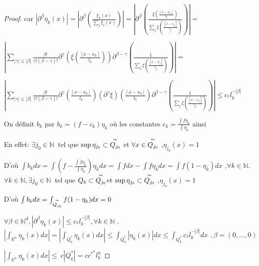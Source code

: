 \documentclass[12pt, a4paper, oneside]{article}
\begin{document}
\begin{proof}
	car $\left\vert \partial ^{\beta }\eta _{k}(x)\right\vert =\left\vert\partial ^{\beta }(\frac{\xi _{k}(x)}{\sum\limits_{j}\xi _{j}(x)})\right\vert =\left\vert \partial ^{\beta }(\frac{\xi (\frac{[x-x_{k}]}{
			l_{k}})}{\sum\limits_{j}\xi (\frac{[x-x_{j}]}{l_{j}})})\right\vert =$
	
	$\left\vert \sum\limits_{\left\vert \gamma \right\vert \leq \left\vert\beta \right\vert }\frac{\beta !}{\gamma !(\beta -\gamma )!}\partial^{\gamma }(\xi (\frac{[x-x_{k}]}{l_{k}}))\partial ^{\beta -\gamma }(\frac{1
	}{\sum\limits_{j}\xi (\frac{[x-x_{j}]}{l_{j}})})\right\vert =$
	
	$\left\vert\sum\limits_{\left\vert \gamma \right\vert\leq \left\vert \beta\right\vert }\frac{\beta !}{\gamma !(\beta -\gamma )!}\partial ^{\gamma }(\frac{[x-x_{k}]}{l_{k}})(\partial ^{\gamma }\xi )(\frac{[x-x_{k}]}{l_{k}})\partial ^{\beta -\gamma }(\frac{1}{\sum\limits_{j}\xi (\frac{[x-x_{j}]}{l_{j}})})\right\vert \leq c_{^{\beta }}l_{k}^{-\left\vert \beta\right\vert }$
	
	On définit $b_{k}$ par $b_{k}=(f-c_{k})\eta _{k}$ où les constantes $ c_{k}=\frac{\int f\eta _{k}}{\int \eta _{k}}$ ainsi 
	
	En effet: $\exists j_{0}\in \mathbb{N}$ $\ $tel que $\sup\eta _{j_{0}}\subset \overset{\thicksim }{Q_{j_{0}}}$
	et $\forall x\in \overset{\thicksim }{Q_{j_{0}}}$ ,$\eta _{j_{0}}(x)=1$
	
	D'où $\int b_{k}dx=\int (f-\frac{\int f\eta _{k}}{\int \eta _{k}})\eta _{k}dx=\int fdx-\int f\eta _{k}dx=\int f(1-\eta _{k})dx$ ,$\forall k\in \mathbb{N}.$ $\forall k\in \mathbb{N},\exists j_{0}\in \mathbb{N}
	$ $\ $tel que $Q_{k}\subset \overset{\thicksim }{Q_{j_{0}}}$et  $\sup\eta_{j_{0}}\subset \overset{\thicksim }{Q_{j_{0}}}$ ,$\eta _{j_{0}}(x)=1$
	
	D'où $\int b_{k}dx=\int_{\overset{\thicksim }{Q_{j_{0}}}}f(1-\eta_{k})dx=0$
	
	$\forall \beta \in \mathbb{N}^{d},\left\vert \partial ^{\beta }\eta _{k}(x)\right\vert \leq c_{^{\beta
	}}l_{k}^{-\left\vert \beta \right\vert },\forall k\in \mathbb{N}$ .
	$\left\vert \int_{\mathbb{R}^{n}}\eta _{k}(x)dx\right\vert =\left\vert \int_{Q_{k}^{\ast }}\eta
	_{k}(x)dx\right\vert \leq \int_{Q_{k}^{\ast }}\left\vert \eta
	_{k}(x)\right\vert dx\leq \int_{Q_{k}^{\ast }}c_{^{\beta
	}}l_{k}^{-\left\vert \beta \right\vert }dx\,\ ,\beta =(0,...,0)$
	
	$\left\vert \int_{\mathbb{R}^{n}}\eta _{k}(x)dx\right\vert \leq \ c\left\vert Q_{k}^{\ast }\right\vert
	=cc^{\ast ^{n}}l_{k}^{n}$
	

\end{proof}
\end{document}

